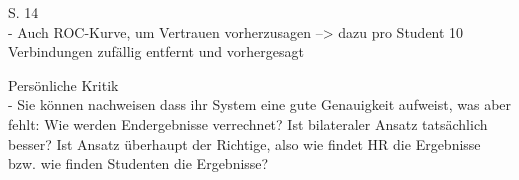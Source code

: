 S. 14\\
- Auch ROC-Kurve, um Vertrauen vorherzusagen --> dazu pro Student 10 Verbindungen zufällig entfernt und vorhergesagt

Persönliche Kritik\\
- Sie können nachweisen dass ihr System eine gute Genauigkeit aufweist, was aber fehlt: Wie werden Endergebnisse verrechnet? Ist bilateraler Ansatz tatsächlich besser? Ist Ansatz überhaupt der Richtige, also wie findet HR die Ergebnisse bzw. wie finden Studenten die Ergebnisse?
